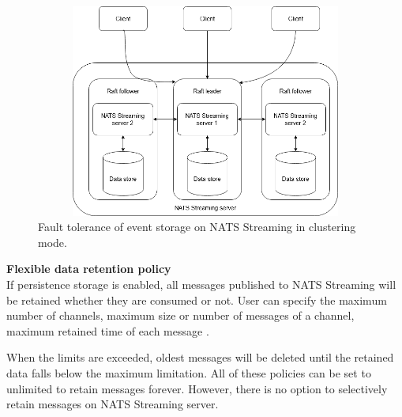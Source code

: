\begin{figure}[h]
	\centering
	\includegraphics[width=12cm,height=7cm]{images/ft-eventstorage-nats.png}
	\caption{Fault tolerance of event storage on NATS Streaming in clustering mode.}
	\label{fig:natsftstorage}
\end{figure}

\textbf{Flexible data retention policy}\\
If persistence storage is enabled, all messages published to NATS Streaming will be retained whether they are consumed or not. User can specify the maximum number of channels, maximum size or number of messages of a channel, maximum retained time of each message \cite{natsstoragelimit}.

When the limits are exceeded, oldest messages will be deleted until the retained data falls below the maximum limitation. All of these policies can be set to unlimited to retain messages forever. However, there is no option to selectively retain messages on NATS Streaming server.







